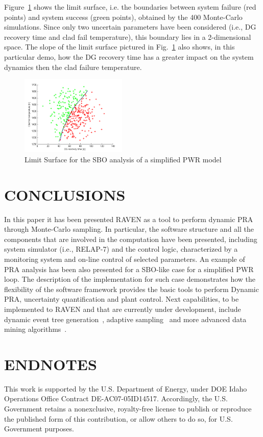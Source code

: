 \documentclass{anstrans}
\begin{document}
Figure~\ref{fig:limit_surface_rng_temp_and_dg} shows the limit surface, i.e. the boundaries between system failure (red points) and system success (green points), obtained by the 400 Monte-Carlo simulations. Since only two uncertain parameters have been considered (i.e., DG recovery time and clad fail temperature), this boundary lies in a 2-dimensional space.
The slope of the limit surface pictured in Fig.~\ref{fig:limit_surface_rng_temp_and_dg} also shows, in this particular demo, how the DG recovery time has a greater impact on the system dynamics then the clad failure temperature.
\begin{figure}
   \centering
    \includegraphics[width=0.45\textwidth]{figures/PRA_limitSurface.png}
    \caption{Limit Surface for the SBO analysis of a simplified PWR model}
    \label{fig:limit_surface_rng_temp_and_dg}
\end{figure}
\section{CONCLUSIONS}
In this paper it has been presented RAVEN as a tool to perform dynamic PRA through Monte-Carlo sampling. In particular, the software structure and all the components that are involved in the computation have been presented, including system simulator (i.e., RELAP-7) and the control logic, characterized by a monitoring system and on-line control of selected parameters.
An example of PRA analysis has been also presented for a SBO-like case for a simplified PWR loop. 
The description of the implementation for such case demonstrates how the flexibility of the software framework provides the basic tools to perform Dynamic PRA, uncertainty quantification and plant control. 
Next capabilities, to be implemented to RAVEN and that are currently under development, include dynamic event tree generation~\cite{ADAPTHakobyan}, adaptive sampling~\cite{mandelliSVMANS} and more advanced data mining algorithms~\cite{mandelliEsrel2011}. 
\section{ENDNOTES}
This work is supported by the U.S. Department of Energy, under DOE Idaho Operations Office Contract DE-AC07-05ID14517. Accordingly, the U.S. Government retains a nonexclusive, royalty-free license to publish or reproduce the published form of this contribution, or allow others to do so, for U.S. Government purposes.



\end{document}
